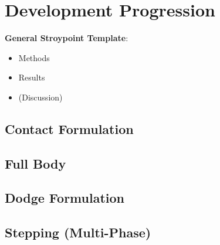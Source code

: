 \section{Development Progression}

\textbf{General Stroypoint Template}: \\
\begin{itemize}
  \item Methods
  \item Results
  \item (Discussion)
\end{itemize}

\subsection{Contact Formulation}

\subsection{Full Body}

\subsection{Dodge Formulation}

\subsection{Stepping (Multi-Phase)}
